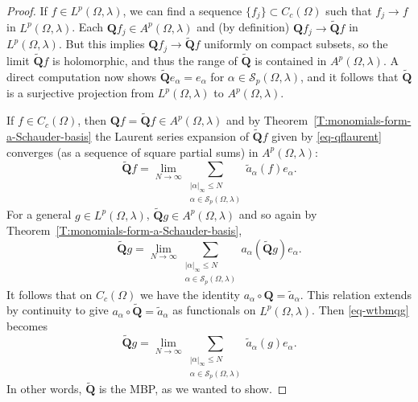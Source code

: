 \documentclass[letterpaper,11pt,reqno]{amsart}
\theoremstyle{plain}
\theoremstyle{definition}
\theoremstyle{remark}
\theoremstyle{remark}
\numberwithin{equation}{section}
\newcommand{\abs}[1]{\left\vert#1\right\vert}
\newcommand{\wt}{\widetilde}
\newcommand{\cs}{{\mathcal S}}
\begin{document}
\begin{proof}
If $f\in L^p(\Omega, \lambda)$, we can find a sequence $\{f_j\}\subset C_c(\Omega)$ such that $f_j\to f$ in $L^p(\Omega,\lambda)$. 
Each $\bm{Q}f_j \in A^p(\Omega, \lambda)$ and (by definition) $\bm{Q}f_j\to \wt{\bm{Q}}f$ in  $L^p(\Omega, \lambda)$. 
But this implies $\bm{Q}f_j\to \wt{\bm{Q}}f$ uniformly on compact subsets, so the limit  $\wt{\bm{Q}}f$ is holomorphic, and thus the range of $\wt{\bm{Q}}$ is contained in $A^p(\Omega, \lambda)$. 
A direct computation now shows $\wt{\bm{Q}}e_\alpha = e_\alpha$ for $\alpha \in \cs_p(\Omega,\lambda)$, and it follows that $\wt{\bm{Q}}$ is a surjective projection from $L^p(\Omega,\lambda)$ to $A^p(\Omega, \lambda)$. 

If $f\in C_c(\Omega) $, then ${\bm{Q}}f = \wt{\bm{Q}}f \in A^p(\Omega, \lambda)$ and by Theorem~\ref{T:monomials-form-a-Schauder-basis} the Laurent series expansion of $\wt{\bm{Q}}f$ given by \eqref{eq-qflaurent} converges (as a sequence of square partial sums) in $A^p(\Omega,\lambda)$:
\begin{equation}\label{eq-qrearrange}
\wt{\bm{Q}}f = \lim_{N\to \infty} \sum_{\substack{\abs{\alpha}_\infty\leq N\\\alpha\in \cs_p(\Omega,\lambda) }}\wt{a}_\alpha(f) e_\alpha. 
\end{equation}
For a general $g \in L^p(\Omega, \lambda)$, $\wt{\bm{Q}}g \in A^p(\Omega,\lambda)$ and so again by Theorem~\ref{T:monomials-form-a-Schauder-basis},
\begin{equation}\label{eq-wtbmqg} 
\wt{\bm{Q}}g = \lim_{N\to \infty} \sum_{\substack{\abs{\alpha}_\infty\leq N\\\alpha\in \cs_p(\Omega,\lambda)}} {a}_\alpha(\wt{\bm{Q}}g) e_\alpha.
\end{equation} 
It follows that on $C_c(\Omega)$ we have the identity $a_\alpha\circ{\bm{Q}}= \wt{a}_\alpha$. 
This relation extends by continuity to give  $a_\alpha\circ{\wt{\bm{Q}}}= \wt{a}_\alpha$ as functionals on $L^p(\Omega, \lambda)$. 
Then \eqref{eq-wtbmqg} becomes
\[
\wt{\bm{Q}}g = \lim_{N\to \infty} \sum_{\substack{\abs{\alpha}_\infty\leq N\\\alpha\in \cs_p(\Omega,\lambda) }}\wt{a}_\alpha(g) e_\alpha.
\]
In other words, $\wt{\bm{Q}}$ is the MBP, as we wanted to show. 
\end{proof}
\end{document}
